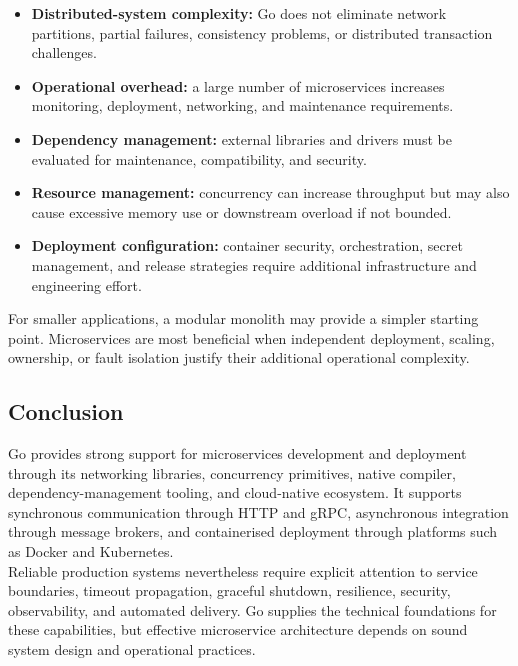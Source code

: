 \begin{itemize}
    \item \textbf{Distributed-system complexity:} Go does not eliminate network partitions, partial failures, consistency problems, or distributed transaction challenges.
    \item \textbf{Operational overhead:} a large number of microservices increases monitoring, deployment, networking, and maintenance requirements.
    \item \textbf{Dependency management:} external libraries and drivers must be evaluated for maintenance, compatibility, and security.
    \item \textbf{Resource management:} concurrency can increase throughput but may also cause excessive memory use or downstream overload if not bounded.
    \item \textbf{Deployment configuration:} container security, orchestration, secret management, and release strategies require additional infrastructure and engineering effort.
\end{itemize}

For smaller applications, a modular monolith may provide a simpler starting point. Microservices are most beneficial when independent deployment, scaling, ownership, or fault isolation justify their additional operational complexity.

\subsection{Conclusion}

Go provides strong support for microservices development and deployment through its networking libraries, concurrency primitives, native compiler, dependency-management tooling, and cloud-native ecosystem. It supports synchronous communication through HTTP and gRPC, asynchronous integration through message brokers, and containerised deployment through platforms such as Docker and Kubernetes.\\

Reliable production systems nevertheless require explicit attention to service boundaries, timeout propagation, graceful shutdown, resilience, security, observability, and automated delivery. Go supplies the technical foundations for these capabilities, but effective microservice architecture depends on sound system design and operational practices.



